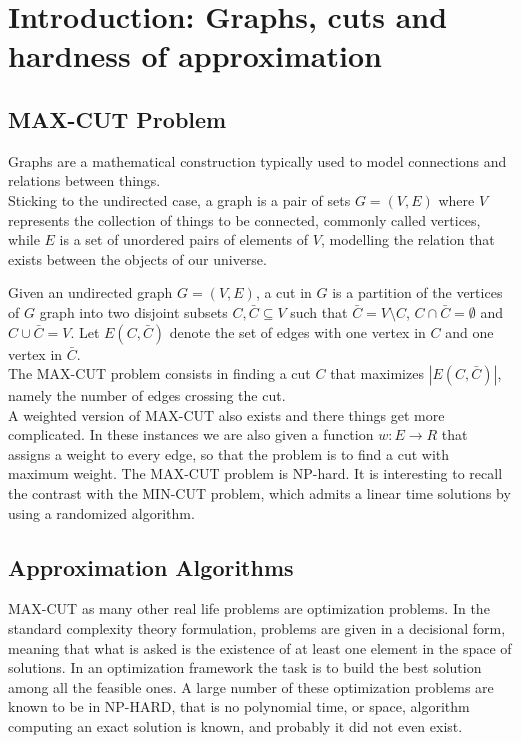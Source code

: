 \section{Introduction: Graphs, cuts and hardness of approximation}

\subsection{MAX-CUT Problem}
Graphs are a mathematical construction typically used to model connections and relations between things. \\
Sticking to the undirected case, a graph is a pair of sets $G=(V,E)$ where $V$ represents the collection of things to be connected, commonly called vertices, while $E$ is a set of unordered pairs of elements of $V$, modelling the relation that exists between the objects of our universe.

Given an undirected graph $G = (V,E)$, a cut in $G$ is a partition of the vertices of $ G $ graph into two disjoint subsets $ C,\bar{C} \subseteq V$ such that $\bar{C} = V \setminus C $, $ C \cap \bar{C} = \emptyset$ and $ C \cup \bar{C} = V $.
Let $E(C,\bar{C})$ denote the set of edges with one vertex in $C$ and one vertex in $\bar{C}$. \\
The MAX-CUT problem consists in finding a cut $C$ that maximizes $|E(C,\bar{C})|$, namely the number of edges crossing the cut. \\
A weighted version of MAX-CUT also exists and there things get more complicated.	
In these instances we are also given a function $w : E \rightarrow R$ that assigns a weight to every edge, so that the problem is to find a cut with maximum weight. The MAX-CUT problem is NP-hard.
It is interesting to recall the contrast with the MIN-CUT problem, which admits a linear time solutions by using a randomized algorithm.

\subsection{Approximation Algorithms}
MAX-CUT as many other real life problems are optimization problems.
In the standard complexity theory formulation, problems are given in a decisional form, meaning that what is asked is the existence of at least one element in the space of solutions.
In an optimization framework the task is to build the best solution among all the feasible ones.
A large number of these optimization problems are known to be in NP-HARD, that is no polynomial time, or space, algorithm computing an exact solution is known, and probably it did not even exist.\\

